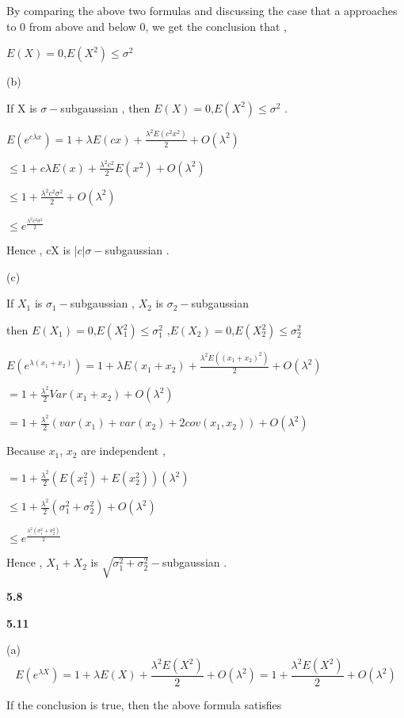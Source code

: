By comparing the above two formulas and discussing the case that a approaches to 0 from above and below 0, we get the conclusion that ,

$E(X)=0$,$E(X^2)\leq\sigma^2$

(b)

If X is $\sigma-$subgaussian , then $E(X)=0$,$E(X^2)\leq\sigma^2$ .

$E(e^{c\lambda x}) = 1+\lambda E(cx)+\frac{\lambda^2 E(c^2 x^2)}{2}+O(\lambda^2)$

$\leq 1+c\lambda E(x)+\frac{\lambda^2 c^2}{2} E(x^2)+O(\lambda^2)$

$\leq 1+\frac{\lambda^2 c^2 \sigma^2}{2}+O(\lambda^2)$

$\leq e^{\frac{\lambda^2 c^2 \sigma^2}{2}}$

Hence , cX is $|c|\sigma-$subgaussian .

(c)

If $X_1$ is $\sigma_1-$subgaussian , $X_2$ is $\sigma_2-$subgaussian

then $E(X_1)=0$,$E(X_1^2)\leq\sigma_1^2$ ,$E(X_2)=0$,$E(X_2^2)\leq\sigma_2^2$

$E(e^{\lambda (x_1+x_2)}) = 1+\lambda E(x_1+x_2)+\frac{\lambda^2 E((x_1+x_2)^2)}{2}+O(\lambda^2)$

$= 1+\frac{\lambda^2}{2} Var(x_1+x_2)+O(\lambda^2)$

$= 1+\frac{\lambda^2}{2} (var(x_1)+var(x_2)+2cov(x_1,x_2))+O(\lambda^2)$

Because $x_1$, $x_2$ are independent ,

$= 1+\frac{\lambda^2}{2} (E(x_1^2) + E(x_2^2))(\lambda^2)$

$\leq 1+\frac{\lambda^2}{2} (\sigma_1^2 + \sigma_2^2)+O(\lambda^2)$

$\leq e^{\frac{\lambda^2 (\sigma_1^2 + \sigma_2^2)}{2}}$

Hence , $X_1+X_2$ is $\sqrt{\sigma_1^2 + \sigma_2^2}-$subgaussian .



\noindent\textbf{5.8}




\noindent\textbf{5.11}




(a)
\begin{equation}
E(e^{\lambda X}) = 1+\lambda E(X)+\frac{\lambda^2 E(X^2)}{2}+O(\lambda^2) =1+\frac{\lambda^2 E(X^2)}{2}+O(\lambda^2)
\end{equation}

If the conclusion is true, then the above formula satisfies

